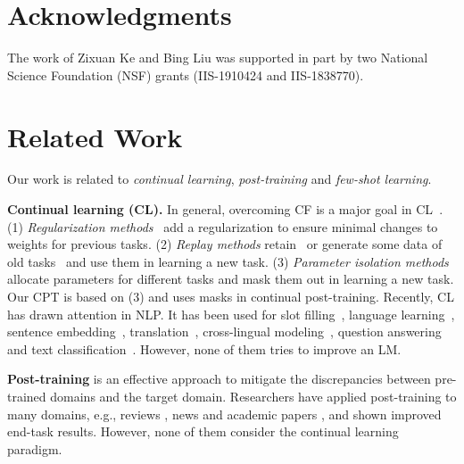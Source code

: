 \documentclass[11pt]{article}
\begin{document}
\section*{Acknowledgments}
{\color{black}The work of Zixuan Ke and Bing Liu was supported in part by two National Science Foundation (NSF) grants (IIS-1910424 and IIS-1838770).} 




\appendix


\newpage

\section{Related Work}
\label{Sectionrelated.work}




Our work is related to \textit{continual learning}, \textit{post-training} and \textit{few-shot learning}.

\textbf{Continual learning (CL).} In general, overcoming CF is a major goal in CL~\cite{chen2018lifelong}. (1) \textit{Regularization methods}~\cite{Kirkpatrick2017overcoming,Seff2017continual} add a regularization to ensure minimal changes to weights for previous tasks.
(2) \textit{Replay methods} retain~\cite{Rebuffi2017,Lopez2017gradient,wang2020efficient,guo2022online} or generate some data of old tasks~\cite{Shin2017continual,He2018overcoming} and use them in learning a new task.
(3) \textit{Parameter isolation methods} \cite{Serra2018overcoming,fernando2017pathnet} allocate parameters for different tasks and mask them out in learning a new task. {\color{black}Our CPT is based on (3) and uses masks in continual post-training.} Recently, CL has drawn attention in NLP. It has been used for slot filling~\cite{shen-etal-2019-progressive}, language learning~\cite{li2019compositional}, sentence embedding~\cite{liu2019continual}, translation~\cite{khayrallah2018regularized}, cross-lingual modeling~\cite{liu2020exploring}, question answering~\cite{greco2019psycholinguistics} and text classification~\cite{DBLP:journals/corr/abs-2112-02706,ke2021Classic,sun2020lamol,huang2021continual,chuang2020lifelong,mehta2021empirical,madotto2020continual}. However, none of them tries to improve an LM.

\textbf{Post-training} is an effective approach to mitigate the discrepancies between pre-trained domains and the target domain. Researchers have applied post-training to many domains, e.g., reviews \cite{DBLP:conf/naacl/XuLSY19,sun2019fine}, news and academic papers \cite{DBLP:conf/acl/GururanganMSLBD20}, and shown improved end-task results. However, none of them consider the continual learning paradigm. 
\end{document}
